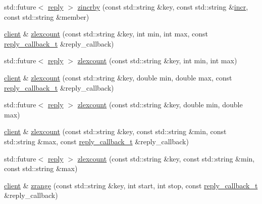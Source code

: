 \begin{DoxyCompactItemize}
\item 
std\+::future$<$ \hyperlink{classcpp__redis_1_1reply}{reply} $>$ \hyperlink{classcpp__redis_1_1client_a202a2adbf6e0d127ad1c5cc301754e5b}{zincrby} (const std\+::string \&key, const std\+::string \&\hyperlink{classcpp__redis_1_1client_a2f9ba6c7e83451207403096b19da4faa}{incr}, const std\+::string \&member)
\item 
\hyperlink{classcpp__redis_1_1client}{client} \& \hyperlink{classcpp__redis_1_1client_ad4a8fef29a047724ad4e97eedfb53c62}{zlexcount} (const std\+::string \&key, int min, int max, const \hyperlink{classcpp__redis_1_1client_a061a1140d36d2eaeda82b09a0bb3f9f2}{reply\+\_\+callback\+\_\+t} \&reply\+\_\+callback)
\item 
std\+::future$<$ \hyperlink{classcpp__redis_1_1reply}{reply} $>$ \hyperlink{classcpp__redis_1_1client_aff60a1181d93d961f6ca1903522ce899}{zlexcount} (const std\+::string \&key, int min, int max)
\item 
\hyperlink{classcpp__redis_1_1client}{client} \& \hyperlink{classcpp__redis_1_1client_aba1b2a6c750b13b1a632ebc8ca90cf60}{zlexcount} (const std\+::string \&key, double min, double max, const \hyperlink{classcpp__redis_1_1client_a061a1140d36d2eaeda82b09a0bb3f9f2}{reply\+\_\+callback\+\_\+t} \&reply\+\_\+callback)
\item 
std\+::future$<$ \hyperlink{classcpp__redis_1_1reply}{reply} $>$ \hyperlink{classcpp__redis_1_1client_ab492b901c49f913d0120b87afee9458c}{zlexcount} (const std\+::string \&key, double min, double max)
\item 
\hyperlink{classcpp__redis_1_1client}{client} \& \hyperlink{classcpp__redis_1_1client_a90bd86c8348ca8bfec29d66d9e5bdfc3}{zlexcount} (const std\+::string \&key, const std\+::string \&min, const std\+::string \&max, const \hyperlink{classcpp__redis_1_1client_a061a1140d36d2eaeda82b09a0bb3f9f2}{reply\+\_\+callback\+\_\+t} \&reply\+\_\+callback)
\item 
std\+::future$<$ \hyperlink{classcpp__redis_1_1reply}{reply} $>$ \hyperlink{classcpp__redis_1_1client_ace7bbf92a0ea2cac775e5bc66a0d1ea8}{zlexcount} (const std\+::string \&key, const std\+::string \&min, const std\+::string \&max)
\item 
\hyperlink{classcpp__redis_1_1client}{client} \& \hyperlink{classcpp__redis_1_1client_a70025f24f20e81397868467651c804a9}{zrange} (const std\+::string \&key, int start, int stop, const \hyperlink{classcpp__redis_1_1client_a061a1140d36d2eaeda82b09a0bb3f9f2}{reply\+\_\+callback\+\_\+t} \&reply\+\_\+callback)
\item 

\end{DoxyCompactItemize}
